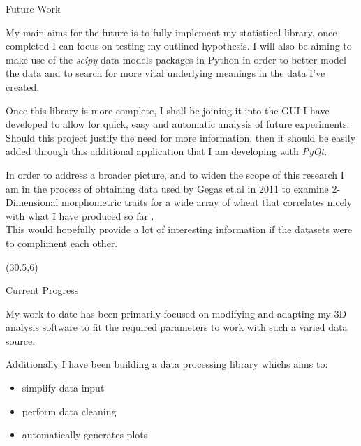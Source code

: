 \documentclass[final]{beamer}
\begin{document}
\begin{frame}{}
\begin{textblock}{27.7}
    \begin{block}{Future Work}

      My main aims for the future is to fully implement my statistical library, once completed I can
      focus on testing my outlined hypothesis. I will also be aiming to make use of the \textit{scipy}
      data models packages in Python in order to better model the data and to search for more vital
      underlying meanings in the data I've created.

      \vspace{0.5cm}

      Once this library is more complete, I shall be joining it into the GUI I have developed
      to allow for quick, easy and automatic analysis of future experiments. Should this
      project justify the need for more information, then it should be easily added through
      this additional application that I am developing with \textit{PyQt}. 

      \vspace{0.5cm}
      In order to address a broader picture, and to widen the scope of this research I am in the process of
      obtaining data used by Gegas et.al in 2011 to examine 2-Dimensional morphometric traits for a wide array of
      wheat that correlates nicely with what I have produced so far \cite{gegas}.
      \\
      This would hopefully provide a lot of interesting information if the datasets were to compliment each other.
    \end{block}


  \end{textblock}

  \begin{textblock}{27.7}(30.5,6)

    \begin{block}{Current Progress}

      My work to date has been primarily focused on modifying
      and adapting my 3D analysis software to fit the required
      parameters to work with such a varied data source.

      \vspace{0.5cm}

      Additionally I have been building a data processing library whichs aims to:
      \begin{multicols}{2}
        
        \begin{itemize}
        \item simplify data input
        \item perform data cleaning
        \item automatically generates plots
        \end{itemize}


\end{multicols}
\end{block}
\end{textblock}
\end{frame}
\end{document}
